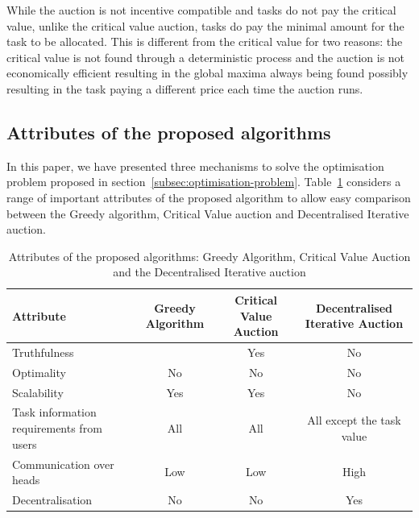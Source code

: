 While the auction is not incentive compatible and tasks do not pay the critical value, unlike the critical value
auction, tasks do pay the minimal amount for the task to be allocated. This is different from the critical value for
two reasons: the critical value is not found through a deterministic process and the auction is not economically
efficient resulting in the global maxima always being found possibly resulting in the task paying a different price
each time the auction runs.

\subsection{Attributes of the proposed algorithms}
\label{subsec:attributes-of-proposed-algorithms}
In this paper, we have presented three mechanisms to solve the optimisation problem proposed in
section~\ref{subsec:optimisation-problem}. Table~\ref{tab:attributes_algorithms} considers a range of
important attributes of the proposed algorithm to allow easy comparison between the Greedy algorithm,
Critical Value auction and Decentralised Iterative auction.

\begin{table}[H]
    \begin{tabular}{|p{3cm}|c|c|c|}
        \hline
        \textbf{Attribute} & Greedy Algorithm & Critical Value Auction & Decentralised Iterative Auction \\ \hline
        Truthfulness & & Yes & No \\ \hline
        Optimality & No  & No & No \\ \hline
        Scalability & Yes & Yes & No \\ \hline
        Task information requirements from users & All & All & All except the task value \\ \hline
        Communication over heads & Low & Low & High \\ \hline
        Decentralisation & No  & No  & Yes \\ \hline
    \end{tabular}
    \caption{Attributes of the proposed algorithms: Greedy Algorithm, Critical Value Auction and the
    Decentralised Iterative auction}
    \label{tab:attributes_algorithms}
\end{table}
